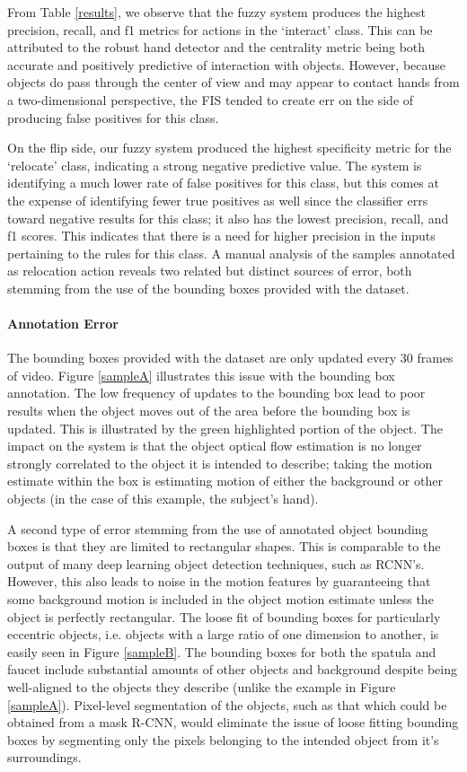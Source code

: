 \documentclass[12pt]{report}
\begin{document}
From Table \ref{results}, we observe that the fuzzy system produces the highest precision, recall, and f1 metrics for actions in the `interact' class. This can be attributed to the robust hand detector and the centrality metric being both accurate and positively predictive of interaction with objects. However, because objects do pass through the center of view and may appear to contact hands from a two-dimensional perspective, the FIS tended to create err on the side of producing false positives for this class.

On the flip side, our fuzzy system produced the highest specificity metric for the `relocate' class, indicating a strong negative predictive value. The system is identifying a much lower rate of false positives for this class, but this comes at the expense of identifying fewer true positives as well since the classifier errs toward negative results for this class; it also has the lowest precision, recall, and f1 scores. This indicates that there is a need for higher precision in the inputs pertaining to the rules for this class. A manual analysis of the samples annotated as relocation action reveals two related but distinct sources of error, both stemming from the use of the bounding boxes provided with the dataset.

\paragraph{Annotation Error}
The bounding boxes provided with the dataset are only updated every 30 frames of video. Figure \ref{sampleA} illustrates this issue with the bounding box annotation. The low frequency of updates to the bounding box lead to poor results when the object moves out of the area before the bounding box is updated. This is illustrated by the green highlighted portion of the object. The impact on the system is that the object optical flow estimation is no longer strongly correlated to the object it is intended to describe; taking the motion estimate within the box is estimating motion of either the background or other objects (in the case of this example, the subject's hand).

A second type of error stemming from the use of annotated object bounding boxes is that they are limited to rectangular shapes. This is comparable to the output of many deep learning object detection techniques, such as RCNN's. However, this also leads to noise in the motion features by guaranteeing that some background motion is included in the object motion estimate unless the object is perfectly rectangular. The loose fit of bounding boxes for particularly eccentric objects, i.e. objects with a large ratio of one dimension to another, is easily seen in Figure \ref{sampleB}. The bounding boxes for both the spatula and faucet include substantial amounts of other objects and background despite being well-aligned to the objects they describe (unlike the example in Figure \ref{sampleA}). Pixel-level segmentation of the objects, such as that which could be obtained from a mask R-CNN, would eliminate the issue of loose fitting bounding boxes by segmenting only the pixels belonging to the intended object from it's surroundings.
\end{document}
